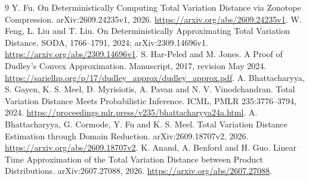 \documentclass[11pt]{article}
\begin{document}
\begin{thebibliography}{9}
 Y. Fu. On Deterministically Computing Total Variation Distance
via Zonotope Compression. arXiv:2609.24235v1, 2026.
\url{https://arxiv.org/abs/2609.24235v1}.
 W. Feng, L. Liu and T. Liu. On Deterministically Approximating
Total Variation Distance. SODA, 1766--1791, 2024; arXiv:2309.14696v1.
\url{https://arxiv.org/abs/2309.14696v1}.
 S. Har-Peled and M. Jones. A Proof of Dudley's Convex
Approximation. Manuscript, 2017, revision May 2024.
\url{https://sarielhp.org/p/17/dudley_approx/dudley_approx.pdf}.
 A. Bhattacharyya, S. Gayen, K. S. Meel, D. Myrisiotis,
A. Pavan and N. V. Vinodchandran. Total Variation Distance Meets Probabilistic
Inference. ICML, PMLR 235:3776--3794, 2024.
\url{https://proceedings.mlr.press/v235/bhattacharyya24a.html}.
 A. Bhattacharyya, G. Cormode, Y. Fu and K. S. Meel.
Total Variation Distance Estimation through Domain Reduction.
arXiv:2609.18707v2, 2026. \url{https://arxiv.org/abs/2609.18707v2}.
 K. Anand, A. Benford and H. Guo. Linear Time Approximation
of the Total Variation Distance between Product Distributions.
arXiv:2607.27088, 2026. \url{https://arxiv.org/abs/2607.27088}.
\end{thebibliography}
\end{document}
